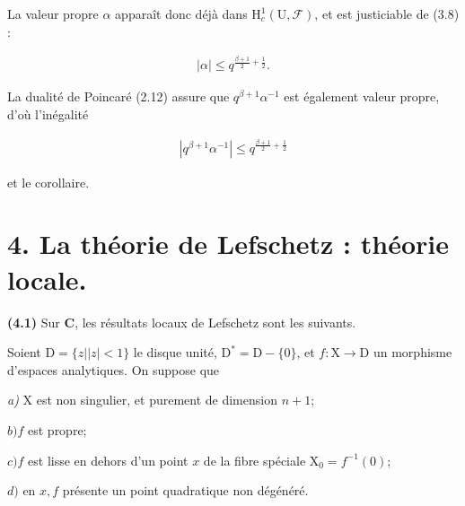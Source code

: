 \documentclass[10pt,leqno]{article}
\begin{document}
\clearpage

\label{physical-16}

\noindent La valeur propre \(\alpha \) apparaît donc déjà dans \(\mathrm{H}_{c}^{1}(\mathrm{U},\mathcal{F} )\), et est justiciable de (3.8) :\par

\begin{equation*}\begin{gathered}|\alpha | \leq  q^{\frac{\beta+1}{2}+\frac{1}{2}}.\end{gathered}\end{equation*}

\noindent La dualité de Poincaré (2.12) assure que \(q^{\beta +1}\alpha ^{- 1}\) est également valeur propre, d’où l’inégalité\par

\begin{equation*}\begin{gathered}|q^{\beta +1}\alpha ^{- 1}| \leq  q^{\frac{\beta+1}{2}+\frac{1}{2}}\end{gathered}\end{equation*}

\noindent et le corollaire.\par

\section*{4. La théorie de Lefschetz : théorie locale.}

\noindent \textbf{(4.1)} Sur \(\mathbf{C}\), les résultats locaux de Lefschetz sont les suivants.\par

\noindent Soient \(\mathrm{D}=\{z | |z|<1\}\) le disque unité, \(\mathrm{D}^{*}=\mathrm{D}- \{0\}\), et \(f : \mathrm{X}\longrightarrow \mathrm{D}\) un morphisme d’espaces analytiques. On suppose que\par

\noindent \emph{a)} \(\mathrm{X}\) est non singulier, et purement de dimension \(n+1\);\par

\noindent \(b) f\) est propre;\par

\noindent \(c) f\) est lisse en dehors d’un point \(x\) de la fibre spéciale \(\mathrm{X}_{0}=f^{- 1}(0)\);\par

\noindent \(d)\) en \(x, f\) présente un point quadratique non dégénéré.\par
\end{document}
